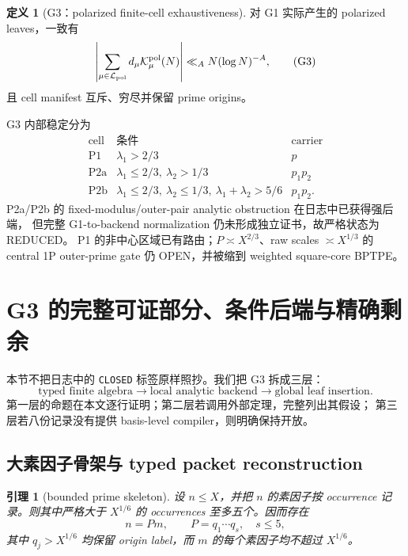 \documentclass[11pt,a4paper]{ctexart}
\newtheorem{lemma}[theorem]{引理}
\theoremstyle{definition}
\newtheorem{definition}[theorem]{定义}
\newcommand{\1}{\mathbf 1}
\newcommand{\K}{\mathcal K}
\newcommand{\LL}{\mathcal L}
\newcommand{\OPEN}{\textcolor{red!70!black}{\textsf{OPEN}}}
\newcommand{\REDUCED}{\textcolor{orange!80!black}{\textsf{REDUCED}}}
\begin{document}
\begin{definition}[G3：polarized finite-cell exhaustiveness]
对 G1 实际产生的 polarized leaves，一致有
\[
\left|\sum_{\mu\in\LL_{\rm pol}}d_\mu
\K_\mu^{\rm pol}(N)\right|
\ll_A N(\log N)^{-A},                                  \tag{G3}
\]
且 cell manifest 互斥、穷尽并保留 prime origins。
\end{definition}

G3 内部稳定分为
\[
\begin{array}{c|c|c}
\text{cell}&\text{条件}&\text{carrier}\\ \hline
\mathrm{P1}&\lambda_1>2/3&p\\
\mathrm{P2a}&\lambda_1\le2/3,\ \lambda_2>1/3&p_1p_2\\
\mathrm{P2b}&\lambda_1\le2/3,\ \lambda_2\le1/3,
\ \lambda_1+\lambda_2>5/6&p_1p_2.
\end{array}                                             \tag{5.1}
\]
P2a/P2b 的 fixed-modulus/outer-pair analytic obstruction 在日志中已获得强后端，
但完整 G1-to-backend normalization 仍未形成独立证书，故严格状态为 \REDUCED。
P1 的非中心区域已有路由；$P\asymp X^{2/3}$、raw scales $\asymp X^{1/3}$
的 central 1P outer-prime gate 仍 \OPEN，并被缩到 weighted square-core BPTPE。

\section{G3 的完整可证部分、条件后端与精确剩余}

本节不把日志中的 \texttt{CLOSED} 标签原样照抄。我们把 G3 拆成三层：
\[
\boxed{
\text{typed finite algebra}
\longrightarrow
\text{local analytic backend}
\longrightarrow
\text{global leaf insertion}.}
\tag{6.1}
\]
第一层的命题在本文逐行证明；第二层若调用外部定理，完整列出其假设；
第三层若八份记录没有提供 basis-level compiler，则明确保持开放。

\subsection{大素因子骨架与 typed packet reconstruction}

\begin{lemma}[bounded prime skeleton]\label{lem:prime-skeleton}
设 $n\le X$，并把 $n$ 的素因子按 occurrence 记录。则其中严格大于
$X^{1/6}$ 的 occurrences 至多五个。因而存在
\[
n=P m,\qquad P=q_1\cdots q_s,\quad s\le5,             \tag{6.2}
\]
其中 $q_j>X^{1/6}$ 均保留 origin label，而 $m$ 的每个素因子均不超过
$X^{1/6}$。
\end{lemma}
\end{document}
